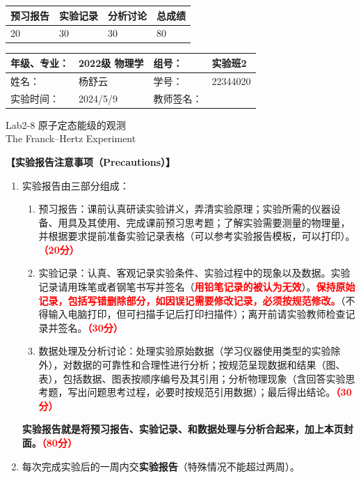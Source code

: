 \documentclass[dvipsnames, svgnames,a4paper,11pt]{article}
\begin{document}
	
	
	
	
	\begin{table}
		\renewcommand\arraystretch{1.7}
		\begin{tabularx}{\textwidth}{
				|X|X|X|X
				|X|X|X|X|}
			\hline
			\multicolumn{2}{|c|}{预习报告}&\multicolumn{2}{|c|}{实验记录}&\multicolumn{2}{|c|}{分析讨论}&\multicolumn{2}{|c|}{总成绩}\\
			\hline
			\LARGE20 & & \LARGE30 & & \LARGE30 & & \LARGE80 & \\
			\hline
		\end{tabularx}
	\end{table}
	
	\begin{table}
		\renewcommand\arraystretch{1.7}
		\begin{tabularx}{\textwidth}{|X|X|X|X|}
			\hline
			年级、专业： & 2022级 物理学 &组号： & 实验班2\\
			\hline
			姓名： & 杨舒云  & 学号： & 22344020\\
			\hline
			实验时间： & 2024/5/9 & 教师签名： & \\
			\hline
		\end{tabularx}
	\end{table}
	
	\begin{center}
		\LARGE Lab2-8 \quad 原子定态能级的观测\\The Franck–Hertz Experiment
	\end{center}
	
	
	\textbf{【实验报告注意事项（Precautions）】}
	\begin{enumerate}
		\item 实验报告由三部分组成：
		\begin{enumerate}
			\item 预习报告：课前认真研读实验讲义，弄清实验原理；实验所需的仪器设备、用具及其使用、完成课前预习思考题；了解实验需要测量的物理量，并根据要求提前准备实验记录表格（可以参考实验报告模板，可以打印）。\textcolor{red}{\textbf{（20分）}}
			\item 实验记录：认真、客观记录实验条件、实验过程中的现象以及数据。实验记录请用珠笔或者钢笔书写并签名（\textcolor{red}{\textbf{用铅笔记录的被认为无效}}）。\textcolor{red}{\textbf{保持原始记录，包括写错删除部分，如因误记需要修改记录，必须按规范修改。}}（不得输入电脑打印，但可扫描手记后打印扫描件）；离开前请实验教师检查记录并签名。\textcolor{red}{\textbf{（30分）}}
			\item 数据处理及分析讨论：处理实验原始数据（学习仪器使用类型的实验除外），对数据的可靠性和合理性进行分析；按规范呈现数据和结果（图、表），包括数据、图表按顺序编号及其引用；分析物理现象（含回答实验思考题，写出问题思考过程，必要时按规范引用数据）；最后得出结论。\textcolor{red}{\textbf{（30分）}}
		\end{enumerate}
		\textbf{实验报告就是将预习报告、实验记录、和数据处理与分析合起来，加上本页封面。\textcolor{red}{（80分）}}
		\item 每次完成实验后的一周内交\textbf{实验报告}（特殊情况不能超过两周）。
	\end{enumerate}
	
\end{document}
